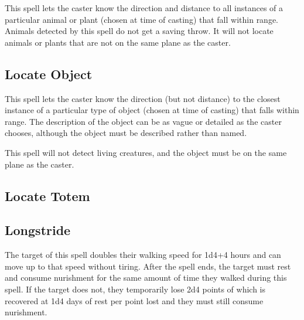 \begin{multicols*}{2}
This spell lets the caster know the direction and distance to all instances of a particular animal or plant (chosen at time of casting) that fall within range. Animals detected by this spell do not get a saving throw. It will not locate animals or plants that are not on the same plane as the caster.

\subsection{Locate Object}\label{spell:Locate Object}

This spell lets the caster know the direction (but not distance) to the closest instance of a particular type of object (chosen at time of casting) that falls within range. The description of the object can be as vague or detailed as the caster chooses, although the object must be described rather than named.

This spell will not detect living creatures, and the object must be on the same plane as the caster.

\subsection{Locate Totem}\label{spell:Locate Totem}



\subsection{Longstride}\label{spell:Longstride}

The target of this spell doubles their walking speed for 1d4+4 hours and can move up to that speed without tiring. After the spell ends, the target must rest and consume nurishment for the same amount of time they walked during this spell. If the target does not, they temporarily lose 2d4 points of  which is recovered at 1d4 days of rest per point lost and they must still consume nurishment.


\end{multicols*}
